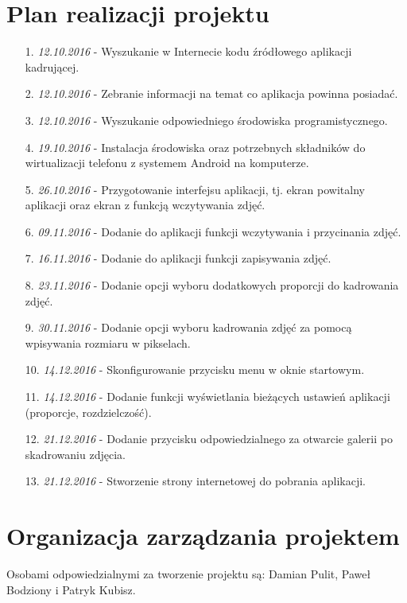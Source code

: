\section{Plan realizacji projektu}
\begin{itemize} \itemsep1pt \parskip0pt 
\item [1.] \textit{12.10.2016} - Wyszukanie w Internecie kodu źródłowego aplikacji kadrującej.
\item [2.] \textit{12.10.2016} - Zebranie informacji na temat co aplikacja powinna posiadać.
\item [3.] \textit{12.10.2016} - Wyszukanie odpowiedniego środowiska programistycznego.
\item [4.] \textit{19.10.2016} - Instalacja środowiska oraz potrzebnych składników do wirtualizacji telefonu z systemem Android na komputerze. 
\item [5.] \textit{26.10.2016} - Przygotowanie interfejsu aplikacji, tj. ekran powitalny aplikacji oraz ekran z funkcją wczytywania zdjęć.
\item [6.] \textit{09.11.2016} - Dodanie do aplikacji funkcji wczytywania i przycinania zdjęć.
\item [7.] \textit{16.11.2016} - Dodanie do aplikacji funkcji zapisywania zdjęć.
\item [8.] \textit{23.11.2016} - Dodanie opcji wyboru dodatkowych proporcji do kadrowania zdjęć.
\item [9.] \textit{30.11.2016} - Dodanie opcji wyboru kadrowania zdjęć za pomocą wpisywania rozmiaru w pikselach.
\item [10.] \textit{14.12.2016} - Skonfigurowanie przycisku menu w oknie startowym.
\item [11.] \textit{14.12.2016} - Dodanie funkcji wyświetlania bieżących ustawień aplikacji (proporcje, rozdzielczość).
\item [12.] \textit{21.12.2016} - Dodanie przycisku odpowiedzialnego za otwarcie galerii po skadrowaniu zdjęcia. 
\item [13.] \textit{21.12.2016} - Stworzenie strony internetowej do pobrania aplikacji. 
\end{itemize}

\section{Organizacja zarządzania projektem}
Osobami odpowiedzialnymi za tworzenie projektu są: Damian Pulit, Paweł \\ Bodziony i Patryk Kubisz. 

